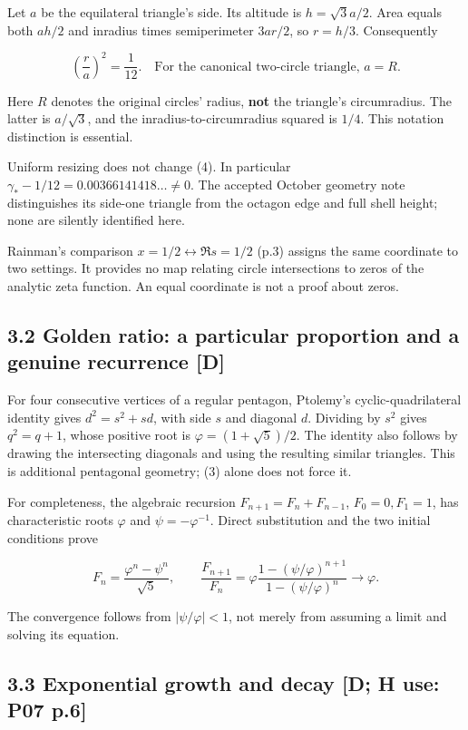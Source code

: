 \documentclass[11pt,a4paper]{article}
\begin{document}
Let $a$ be the equilateral triangle's side. Its altitude is $h=\sqrt3a/2$. Area equals both $ah/2$ and inradius times semiperimeter $3ar/2$, so $r=h/3$. Consequently


\[
\left(\frac r a\right)^2=\frac1{12}.
\quad\text{For the canonical two-circle triangle, }a=R. \tag{4}
\]

Here $R$ denotes the original circles' radius, \textbf{not} the triangle's circumradius. The latter is $a/\sqrt3$, and the inradius-to-circumradius squared is $1/4$. This notation distinction is essential.


Uniform resizing does not change (4). In particular $\gamma_*-1/12=0.00366141418\ldots\ne0$. The accepted October geometry note distinguishes its side-one triangle from the octagon edge and full shell height; none are silently identified here.


Rainman's comparison $x=1/2\leftrightarrow\Re s=1/2$ (p.3) assigns the same coordinate to two settings. It provides no map relating circle intersections to zeros of the analytic zeta function. An equal coordinate is not a proof about zeros.


\subsection*{3.2 Golden ratio: a particular proportion and a genuine recurrence [D]}

For four consecutive vertices of a regular pentagon, Ptolemy's cyclic-quadrilateral identity gives $d^2=s^2+sd$, with side $s$ and diagonal $d$. Dividing by $s^2$ gives $q^2=q+1$, whose positive root is $\varphi=(1+\sqrt5)/2$. The identity also follows by drawing the intersecting diagonals and using the resulting similar triangles. This is additional pentagonal geometry; (3) alone does not force it.


For completeness, the algebraic recursion $F_{n+1}=F_n+F_{n-1}$, $F_0=0,F_1=1$, has characteristic roots $\varphi$ and $\psi=-\varphi^{-1}$. Direct substitution and the two initial conditions prove


\[
F_n=\frac{\varphi^n-\psi^n}{\sqrt5},\qquad
\frac{F_{n+1}}{F_n}=
\varphi\frac{1-(\psi/\varphi)^{n+1}}{1-(\psi/\varphi)^n}
\longrightarrow\varphi. \tag{5}
\]

The convergence follows from $|\psi/\varphi|<1$, not merely from assuming a limit and solving its equation.


\subsection*{3.3 Exponential growth and decay [D; H use: P07 p.6]}
\end{document}
